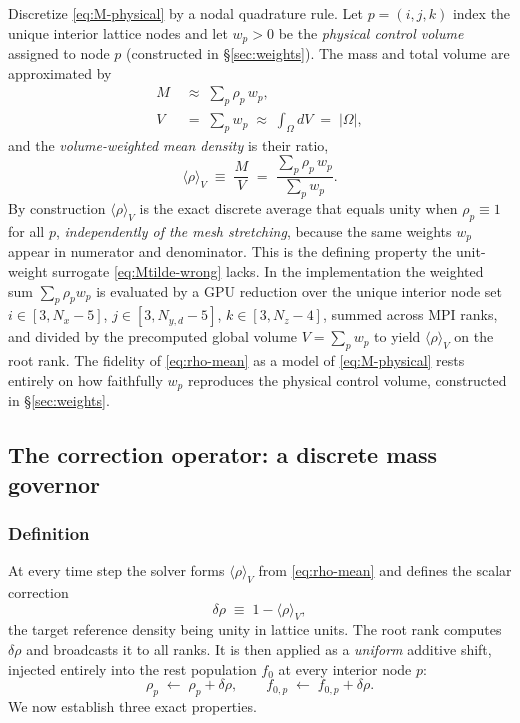 \documentclass[11pt]{article}
\theoremstyle{definition}
\theoremstyle{remark}
\begin{document}
Discretize \eqref{eq:M-physical} by a nodal quadrature rule. Let $p=(i,j,k)$
index the unique interior lattice nodes and let $w_p>0$ be the \emph{physical
control volume} assigned to node $p$ (constructed in \S\ref{sec:weights}). The
mass and total volume are approximated by
\begin{align}
M &\;\approx\; \sum_{p} \rho_p\, w_p ,
\label{eq:M-quad}\\[2pt]
V &\;=\; \sum_{p} w_p
   \;\approx\; \int_{\Omega} dV \;=\; |\Omega| ,
\label{eq:V-quad}
\end{align}
and the \emph{volume-weighted mean density} is their ratio,
\begin{equation}
\langle\rho\rangle_V
\;\equiv\;\frac{M}{V}
\;=\;\frac{\sum_{p}\rho_p\,w_p}{\sum_{p}w_p}.
\label{eq:rho-mean}
\end{equation}
By construction $\langle\rho\rangle_V$ is the exact discrete average that equals
unity when $\rho_p\equiv 1$ for all $p$, \emph{independently of the mesh
stretching}, because the same weights $w_p$ appear in numerator and denominator.
This is the defining property the unit-weight surrogate \eqref{eq:Mtilde-wrong}
lacks. In the implementation the weighted sum $\sum_p \rho_p w_p$ is evaluated by
a GPU reduction over the unique interior node set $i\in[3,N_x{-}5]$,
$j\in[3,N_{y,d}{-}5]$, $k\in[3,N_z{-}4]$, summed across MPI ranks, and divided by
the precomputed global volume $V=\sum_p w_p$ to yield $\langle\rho\rangle_V$ on
the root rank. The fidelity of \eqref{eq:rho-mean} as a model of
\eqref{eq:M-physical} rests entirely on how faithfully $w_p$ reproduces the
physical control volume, constructed in \S\ref{sec:weights}.

\subsection{The correction operator: a discrete mass governor}
\label{sec:T4}

\subsubsection{Definition}
At every time step the solver forms $\langle\rho\rangle_V$ from
\eqref{eq:rho-mean} and defines the scalar correction
\begin{equation}
\delta\rho \;\equiv\; 1-\langle\rho\rangle_V ,
\label{eq:deltarho}
\end{equation}
the target reference density being unity in lattice units. The root rank computes
$\delta\rho$ and broadcasts it to all ranks. It is then applied as a
\emph{uniform} additive shift, injected entirely into the rest population $f_0$
at every interior node $p$:
\begin{equation}
\rho_p \;\leftarrow\; \rho_p + \delta\rho,
\qquad
f_{0,p} \;\leftarrow\; f_{0,p} + \delta\rho .
\label{eq:apply}
\end{equation}
We now establish three exact properties.
\end{document}
